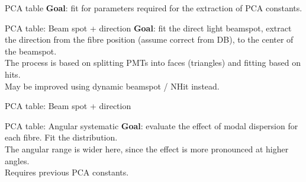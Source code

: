 \documentclass[xcolor=table]{beamer}
\begin{document}
\begin{frame}{PCA table}
\textbf{Goal}: fit for parameters required for the extraction of PCA constants.
\end{frame}

\begin{frame}{PCA table: Beam spot + direction}
\textbf{Goal}: fit the direct light beamspot, extract the direction from the fibre position (assume correct from DB), to the center of the beamspot.  \\
The process is based on splitting PMTs into faces (triangles) and fitting based on hits.\\
May be improved using dynamic beamspot / NHit instead.
\end{frame}

\begin{frame}{PCA table: Beam spot + direction}
\noindent{}
\end{frame}

\begin{frame}{PCA table: Angular systematic}
\textbf{Goal}: evaluate the effect of modal dispersion for each fibre. Fit the distribution.\\
The angular range is wider here, since the effect is more pronounced at higher angles.\\
Requires previous PCA constants.
\end{frame}
\end{document}
